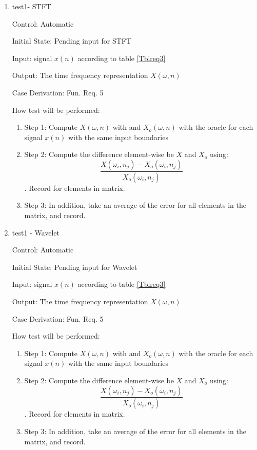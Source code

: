 \documentclass[12pt, titlepage]{article}
\begin{document}
\begin{enumerate}

\item{test1- STFT \\}

Control: Automatic
					
Initial State: Pending input for STFT
					
Input: signal $x(n)$ according to table \ref{Tblreq3}
					
Output: The time frequency representation $X(\omega, n)$

Case Derivation: Fun. Req. 5
					
How test will be performed: 
\begin{enumerate}
\item{Step 1:} Compute $X(\omega, n)$ with \progname{} and $X_o(\omega, n)$ with the oracle for each signal $x(n)$ with the same input boundaries
\item{Step 2:} Compute the difference element-wise be $X$ and $X_o$ using:
\[ \frac{X(\omega_i, n_j) - X_o(\omega_i, n_j)}{X_o(\omega_i, n_j)} \] .
Record for elements in matrix.
\item{Step 3:} In addition, take an average of the error for all elements in the matrix, and record.
\end{enumerate}

\item{test1 - Wavelet\\}

Control: Automatic
					
Initial State: Pending input for Wavelet
					
Input: signal $x(n)$ according to table \ref{Tblreq3}
					
Output: The time frequency representation $X(\omega, n)$

Case Derivation: Fun. Req. 5
					
How test will be performed: 
\begin{enumerate}
\item{Step 1:} Compute $X(\omega, n)$ with \progname{} and $X_o(\omega, n)$ with the oracle for each signal $x(n)$ with the same input boundaries
\item{Step 2:} Compute the difference element-wise be $X$ and $X_o$ using:
\[ \frac{X(\omega_i, n_j) - X_o(\omega_i, n_j)}{X_o(\omega_i, n_j)} \] .
Record for elements in matrix.
\item{Step 3:} In addition, take an average of the error for all elements in the matrix, and record.
\end{enumerate}


\end{enumerate}
\end{document}
